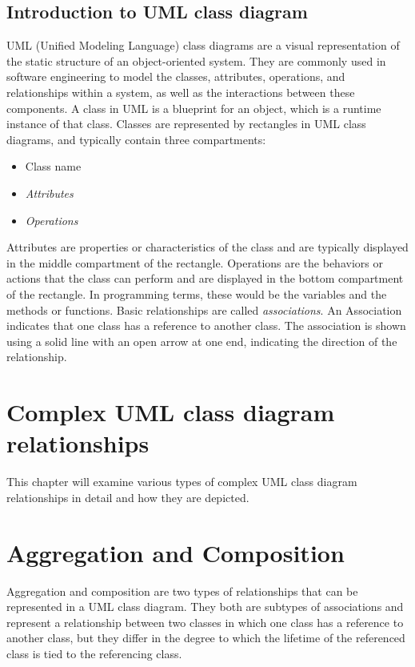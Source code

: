 \documentclass[
	12pt,
    a4paper,
    egregdoesnotlikesansseriftitles, %
    toc=chapterentrywithdots,
    oneside, openany,
    titlepage,
    parskip=half,
    headings=normal,  %
    listof=totoc,
    bibliography=totoc,
    index=totoc,
    captions=tableheading,  %
    listof=flat,
    numbers=noenddot, %
    final]
    {scrbook}
\begin{document}
\section{Introduction to UML class diagram}
UML (Unified Modeling Language) class diagrams are a visual representation of the static structure of an object-oriented system. 
They are commonly used in software engineering to model the classes, attributes, operations, and relationships within a system, as well as the interactions between these components. 
A class in UML is a blueprint for an object, which is a runtime instance of that class. 
Classes are represented by rectangles in UML class diagrams, and typically contain three compartments: 
\begin{itemize}
	\item Class name
	\item \emph{Attributes}
	\item \emph{Operations}
\end{itemize}
Attributes are properties or characteristics of the class and are typically displayed in the middle compartment of the rectangle.
Operations are the behaviors or actions that the class can perform and are displayed in the bottom compartment of the rectangle.
In programming terms, these would be the variables and the methods or functions.
Basic relationships are called \emph{associations}. 
An Association indicates that one class has a reference to another class. \cite[p. 108-111]{uml}
The association is shown using a solid line with an open arrow at one end, indicating the direction of the relationship. \cite[p. 142-143]{uml}


\chapter{Complex UML class diagram relationships}
This chapter will examine various types of complex UML class diagram relationships in detail and how they are depicted.


\chapter{Aggregation and Composition}
Aggregation and composition are two types of relationships that can be represented in a UML class diagram. 
They both are subtypes of associations and represent a relationship between two classes in which one class has a reference to another class, but they differ in the degree to which the lifetime of the referenced class is tied to the referencing class.
\end{document}
